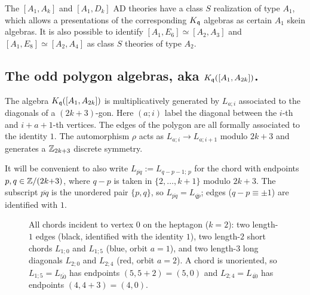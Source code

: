\documentclass[12pt]{amsart}
\begin{document}
The $[A_1,A_k]$ and $[A_1,D_k]$ AD theories have a class $S$ realization of type $A_1$, which allows a
presentations of the corresponding $K_{\mathfrak{q}}$ algebras as certain $A_1$ skein algebras. It is also possible to identify $[A_1,E_6]\simeq [A_2,A_3]$ and 
$[A_1,E_8]\simeq [A_2,A_4]$ as class $S$ theories of type $A_2$. 

\subsection{The odd polygon algebras, aka $K_{\mathfrak{q}}([A_1,A_{2k}])$.}\label{app:a1a2k}
The algebra $K_{\mathfrak{q}}([A_1,A_{2k}])$ is multiplicatively generated by
$L_{a;i}$ associated to the diagonals of a $(2k+3)$-gon. Here $(a;i)$
label the diagonal between the $i$-th and $i+a+1$-th vertices. The
edges of the polygon are all formally associated to the identity $1$.
The automorphism $\rho$ acts as $L_{a;i} \to L_{a;i+1}$ modulo $2k+3$
and generates a $\mathbb{Z}_{2k+3}$ discrete symmetry.

It will be convenient to also write $L_{\overline{pq}} := L_{q-p-1;\,p}$
for the chord with endpoints $p, q \in \mathbb{Z}/(2k{+}3)$, where $q-p$ is
taken in $\{2, \ldots, k+1\}$ modulo $2k{+}3$. The subscript
$\overline{pq}$ is the unordered pair $\{p, q\}$, so
$L_{\overline{pq}} = L_{\overline{qp}}$; edges
($q - p \equiv \pm 1$) are identified with $1$.

\begin{figure}[h]
  \centering
  \caption{All chords incident to vertex $0$ on the heptagon ($k=2$):
    two length-$1$ edges (black, identified with the identity $1$),
    two length-$2$ short chords $L_{1;0}$ and $L_{1;5}$ (blue,
    orbit $a=1$), and two length-$3$ long diagonals $L_{2;0}$ and
    $L_{2;4}$ (red, orbit $a=2$). A chord is unoriented, so
    $L_{1;5} = L_{\overline{50}}$ has endpoints $(5, 5+2) = (5, 0)$
    and $L_{2;4} = L_{\overline{40}}$ has endpoints $(4, 4+3) = (4, 0)$.}
  \label{fig:heptagon-orbits}
\end{figure}
\end{document}
